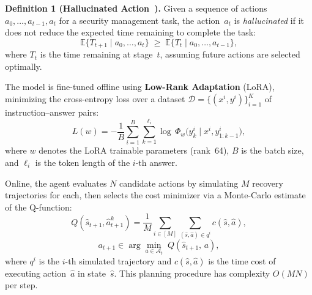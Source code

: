 
\noindent\textbf{Definition 1 (Hallucinated Action~\cite{arXiv:2602.05279}).}
Given a sequence of actions $a_0, \ldots, a_{t-1}, a_t$ for a
security management task, the action~$a_t$ is \textit{hallucinated}
if it does not reduce the expected time remaining to complete the task:
\begin{equation}
\label{eq:hallucination_def}
  \mathbb{E}\{T_{t+1} \mid a_0, \ldots, a_t\}
  \;\geq\;
  \mathbb{E}\{T_t \mid a_0, \ldots, a_{t-1}\},
\end{equation}
where $T_t$ is the time remaining at stage~$t$, assuming future
actions are selected optimally.


%


The model is fine-tuned offline using \textbf{Low-Rank Adaptation}
(LoRA), minimizing the cross-entropy loss over a dataset
$\mathcal{D}=\{(x^i, y^i)\}_{i=1}^K$ of instruction--answer pairs:
\begin{equation}
\label{eq:lora_loss}
  L(w) = -\frac{1}{B}\sum_{i=1}^{B}\sum_{k=1}^{\ell_i}
  \log\,\Phi_w\!\bigl(y^i_k \mid x^i, y^i_{1:k-1}\bigr),
\end{equation}
where $w$ denotes the LoRA trainable parameters (rank~64),
$B$ is the batch size, and $\ell_i$ is the token length of
the $i$-th answer.



Online, the agent evaluates $N$ candidate actions by simulating $M$
recovery trajectories for each, then selects the cost minimizer
via a Monte-Carlo estimate of the Q-function:
\begin{equation}
\label{eq:mc_q}
  Q(\hat{s}_{t+1}, \hat{a}^k_{t+1})
  = \frac{1}{M}\sum_{i\in[M]}\sum_{(\hat{s},\hat{a})\in q^i}
    c(\hat{s}, \hat{a}),
\end{equation}
\begin{equation}
\label{eq:mc_argmin}
  a_{t+1} \in \arg\min_{a \in \mathcal{A}_t}\;
  Q(\hat{s}_{t+1},\, a),
\end{equation}
where $q^i$ is the $i$-th simulated trajectory and $c(\hat{s},\hat{a})$
is the time cost of executing action~$\hat{a}$ in state~$\hat{s}$.
This planning procedure has complexity $O(MN)$ per step.


